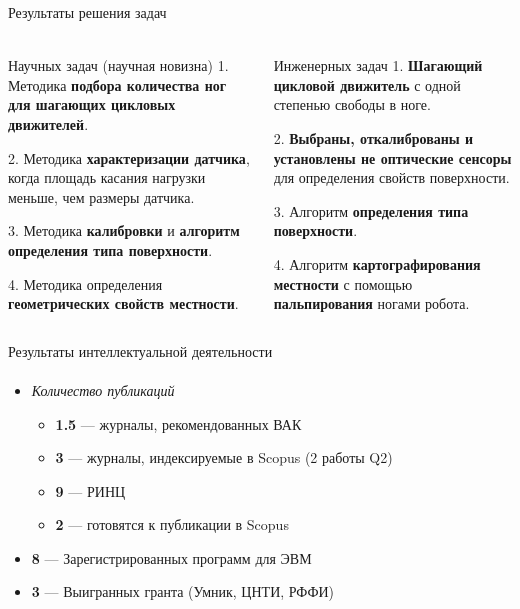 \documentclass[aspectratio=169,xcolor=table]{beamer}
\newcommand{\fbckg}[1]{\usebackgroundtemplate{\texttt{[image: \#1]}}}%
\begin{document}
\begin{frame}[t]{Результаты решения задач}
    \framesubtitle{}
    \vspace{-0.7cm}
        \begin{columns}[T,onlytextwidth]
            \begin{column}{0.48\textwidth}
                \begin{block}{Научных задач (научная новизна)}
                    1. Методика \textbf{подбора количества ног для шагающих цикловых движителей}.
                    
                    2. Методика \textbf{характеризации датчика}, когда площадь касания нагрузки меньше, чем размеры датчика.
                    
                    3. Методика \textbf{калибровки} и \textbf{алгоритм определения типа поверхности}.
                    
                    4. Методика определения \textbf{геометрических свойств местности}.   
                        
                    \end{block}
            \end{column}
            \begin{column}{0.48\textwidth}
                \begin{alertblock}{Инженерных задач}
     1. \textbf{Шагающий цикловой движитель} с одной степенью свободы в ноге.
    
    2. \textbf{Выбраны, откалиброваны и установлены не оптические сенсоры} для определения свойств поверхности.
    
    3. Алгоритм \textbf{определения типа поверхности}.
    
    4. Алгоритм \textbf{картографирования местности} с помощью \textbf{пальпирования} ногами робота.
    
                \end{alertblock}
            \end{column}
        \end{columns}
    \end{frame}

\begin{frame}[t]{Результаты интеллектуальной деятельности}
\framesubtitle{}
\large
\begin{itemize}
    \item \textit{Количество публикаций} 
    \begin{itemize}
        \large
        \item \textbf{1.5} --- журналы, рекомендованных ВАК
        \item \textbf{3} --- журналы, индексируемые в Scopus (2 работы Q2)
        \item \textbf{9} --- РИНЦ
        \item \textbf{2} --- готовятся к публикации в Scopus
    \end{itemize}
    \item \textbf{8} --- Зарегистрированных программ для ЭВМ
    \item \textbf{3} --- Выигранных гранта (Умник, ЦНТИ, РФФИ)
\end{itemize}
\end{frame}


\end{document}

